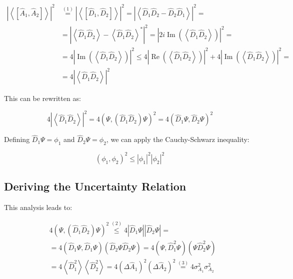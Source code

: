 \documentclass[italian]{HKNdocument}
\begin{document}
\begin{align}
\left|\left\langle\left[\hat{A}_{1}, \hat{A}_{2}\right]\right\rangle\right|^{2} & \stackrel{(1)}{=}\left|\left\langle\left[\hat{D}_{1}, \hat{D}_{2}\right]\right\rangle\right|^{2}=\left|\left\langle\hat{D}_{1} \hat{D}_{2}-\hat{D}_{2} \hat{D}_{1}\right\rangle\right|^{2}= \\
& =\left|\left\langle\hat{D}_{1} \hat{D}_{2}\right\rangle-\left\langle\hat{D}_{1} \hat{D}_{2}\right\rangle^{*}\right|^{2}=\left|2 i \operatorname{Im}\left(\left\langle\hat{D}_{1} \hat{D}_{2}\right\rangle\right)\right|^{2}= \\
& =4\left|\operatorname{Im}\left(\left\langle\hat{D}_{1} \hat{D}_{2}\right\rangle\right)\right|^{2} \leq 4\left|\operatorname{Re}\left(\left\langle\hat{D}_{1} \hat{D}_{2}\right\rangle\right)\right|^{2}+4\left|\operatorname{Im}\left(\left\langle\hat{D}_{1} \hat{D}_{2}\right\rangle\right)\right|^{2}= \\
& =4\left|\left\langle\hat{D}_{1} \hat{D}_{2}\right\rangle\right|^{2}
\end{align}

This can be rewritten as:

\begin{equation}
4\left|\left\langle\hat{D}_{1} \hat{D}_{2}\right\rangle\right|^{2}=4\left(\Psi,\left(\hat{D}_{1} \hat{D}_{2}\right) \Psi\right)^{2}=4\left(\hat{D}_{1} \Psi, \hat{D}_{2} \Psi\right)^{2}
\end{equation}

Defining $\hat{D}_{1} \Psi=\phi_{1}$ and $\hat{D}_{2} \Psi=\phi_{2}$, we can apply the Cauchy-Schwarz inequality:

\begin{equation}
\left(\phi_{1}, \phi_{2}\right)^{2} \leq\left|\phi_{1}\right|^2\left|\phi_{2}\right|^2
\end{equation}


\subsection{Deriving the Uncertainty Relation}
This analysis leads to:

\begin{align}
& 4\left(\Psi,\left(\hat{D}_{1} \hat{D}_{2}\right) \Psi\right)^{2} \stackrel{(2)}{\leq} 4\left|\hat{D}_{1} \Psi\right|\left|\hat{D}_{2} \Psi\right|= \\
& =4\left(\hat{D}_{1} \Psi, \hat{D}_{1} \Psi\right)\left(\hat{D}_{2} \Psi \hat{D}_{2} \Psi\right)=4\left(\Psi, \hat{D}_{1}^{2} \Psi\right)\left(\Psi \hat{D}_{2}^{2} \Psi\right)  \\
& =4\left\langle\hat{D}_{1}^{2}\right\rangle\left\langle\hat{D}_{2}^{2}\right\rangle=4\left(\Delta \hat{A}_{1}\right)^{2}\left(\Delta \hat{A}_{2}\right)^{2} \stackrel{(3)}{=} 4 \sigma_{A_{1}}^{2} \sigma_{A_{2}}^{2}
\end{align}
\end{document}
